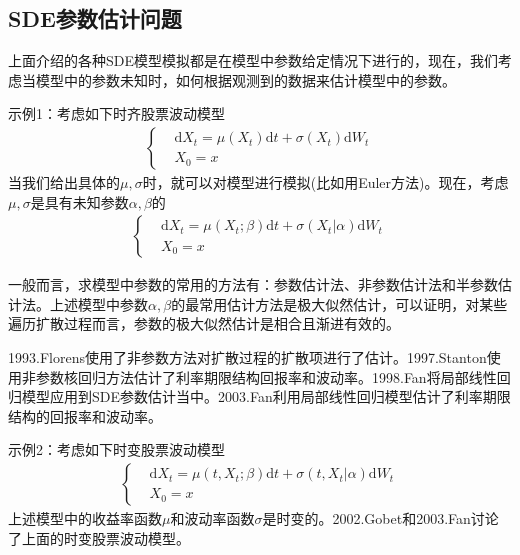     \subsection{SDE参数估计问题}
        \par
        上面介绍的各种SDE模型模拟都是在模型中参数给定情况下进行的，现在，我们考虑当模型中的参数未知时，如何根据观测到的数据来估计模型中的参数。
        \par
        示例1：考虑如下时齐股票波动模型
        \begin{align*}
            \left\{
            \begin{aligned}
            &\mathrm{d}X_t = \mu(X_t)\mathrm{d}t+ \sigma(X_t)\mathrm{d}W_t\\
            &X_0 = x
            \end{aligned}
            \right.
        \end{align*}
        当我们给出具体的$\mu,\sigma$时，就可以对模型进行模拟(比如用Euler方法)。现在，考虑$\mu,\sigma$是具有未知参数$\alpha,\beta$的
        \begin{align*}
            \left\{
            \begin{aligned}
            &\mathrm{d}X_t = \mu(X_t;\beta)\mathrm{d}t+ \sigma(X_t|\alpha)\mathrm{d}W_t\\
            &X_0 = x
            \end{aligned}
            \right.
        \end{align*}
       \par
        一般而言，求模型中参数的常用的方法有：参数估计法、非参数估计法和半参数估计法。上述模型中参数$\alpha,\beta$的最常用估计方法是极大似然估计，可以证明，对某些遍历扩散过程而言，参数的极大似然估计是相合且渐进有效的。
        \par
        1993.Florens\cite{1993.Florens}使用了非参数方法对扩散过程的扩散项进行了估计。1997.Stanton\cite{1997.Stanton}使用非参数核回归方法估计了利率期限结构回报率和波动率。1998.Fan\cite{1998.Fan}将局部线性回归模型应用到SDE参数估计当中。2003.Fan利用局部线性回归模型估计了利率期限结构的回报率和波动率。
        \par
        示例2：考虑如下时变股票波动模型
        \begin{align*}
            \left\{
            \begin{aligned}
            &\mathrm{d}X_t = \mu(t,X_t;\beta)\mathrm{d}t+ \sigma(t,X_t|\alpha)\mathrm{d}W_t\\
            &X_0 = x
            \end{aligned}
            \right.
        \end{align*}
        上述模型中的收益率函数$\mu$和波动率函数$\sigma$是时变的。2002.Gobet\cite{2002.Gobet}和2003.Fan\cite{2003.Fan}讨论了上面的时变股票波动模型。
